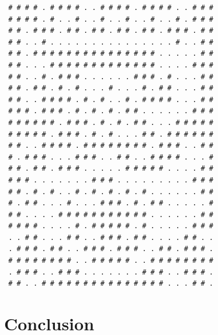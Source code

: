 \documentclass[12pt, letterpaper]{article}
\begin{document}
\begin{lstlisting}
 # # # # . # # # # . . # # # # . # # # # . . # # #
 # # # # . # . . # . . # . . # . . # . . # . # # #
 # # . # # # . # # . # # . # # . # # . # # # . # #
 # # . . # . . . . . . . . . . . . . . . # . . # #
 # # . # # # # # # # # # # # # # # # . . . . . # #
 # # . . . # # # # # # # # # # # # # . . . . # # #
 # # . . # . # # # . . . . . . # # # . # . . . # #
 # # . # # . # . # . . . # . . . # . # # . . . # #
 # # . . # # # # . # . # . . # . # # # # . . . # #
 # # # . # # # . # . # . # . # # . . . . . . # # #
 # # # # # # . # # # . # . # . # # . . . # # # # #
 # # # # # . # # # . # . # . . . # # . # # # # # #
 # # . . # # # # . # # # # # # # # . # # # . . # #
 # . # # # . . . # # # . . # # . . # # # # . . . #
 # # . # # . # # # . . . . . # # # # # . . . . # #
 # # # . . . . . . . # # # . . . . . . . . . # # #
 # # . # . # . . # . # . # . # . # . . . . . . # #
 # . # # . . . # . . . # # # . # . # # . . . . . #
 # # . . . . # # # # # # # # # # # . . . . . . # #
 # # # # . . . . # . # # # # # . # . . . . . # # #
 . . # # . . . # # . . # # # . # # . . . . # # . .
 . # # # . # # . . # # # . # # # . . # # . # # # .
 # # # # # # # # . . # # # # # . . # # # # # # # #
 . # # # . . # # # . . . . . . . # # # . . # # # .
 # # . . # # # # # # # # # # # # # # # . . . # # .
\end{lstlisting}

\section{Conclusion}


% 

% 




\end{document}
